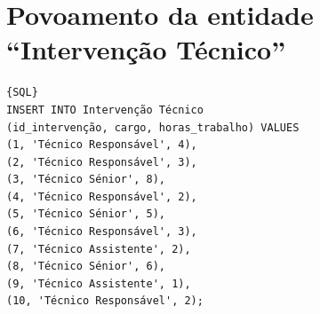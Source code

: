 \section{Povoamento da entidade “Intervenção Técnico”}
{\small
\begin{lstlisting}[breaklines]{SQL}
INSERT INTO Intervenção Técnico
(id_intervenção, cargo, horas_trabalho) VALUES
(1, 'Técnico Responsável', 4),
(2, 'Técnico Responsável', 3),
(3, 'Técnico Sénior', 8),
(4, 'Técnico Responsável', 2),
(5, 'Técnico Sénior', 5),
(6, 'Técnico Responsável', 3),
(7, 'Técnico Assistente', 2),
(8, 'Técnico Sénior', 6),
(9, 'Técnico Assistente', 1),
(10, 'Técnico Responsável', 2);

\end{lstlisting}
}
